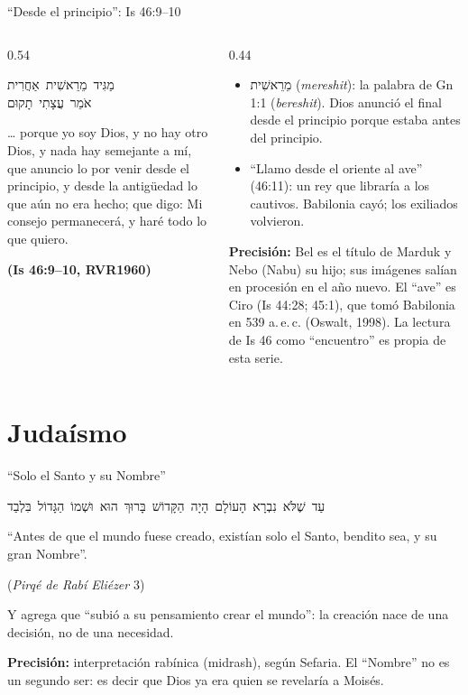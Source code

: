 \documentclass[hyperref={bookmarks=false},aspectratio=169]{beamer}
\newcommand{\heb}[1]{\mbox{\foreignlanguage{hebrew}{#1}}}
\newcommand{\fuente}[1]{\par\hfill{\upshape\bfseries\footnotesize\textcolor{azul}{#1}}}
\newcommand{\precision}[1]{{\footnotesize\color{gris}\textbf{Precisión:} #1}}
\begin{document}
\begin{frame}{``Desde el principio'': Is 46:9--10}
\begin{columns}[t,onlytextwidth]
\begin{column}{0.54\textwidth}
\begin{center}\heb{מַגִּיד מֵרֵאשִׁית אַחֲרִית}\\[1pt]\heb{אֹמֵר עֲצָתִי תָקוּם}\end{center}
\begin{cita}\ldots{} porque yo soy Dios, y no hay otro Dios, y nada hay semejante a mí, que anuncio lo por venir desde el principio, y desde la antigüedad lo que aún no era hecho; que digo: Mi consejo permanecerá, y haré todo lo que quiero.\fuente{(Is 46:9--10, RVR1960)}\end{cita}
\end{column}
\begin{column}{0.44\textwidth}\scriptsize
\begin{itemize}
\item \heb{מֵרֵאשִׁית} (\emph{mereshit}): la palabra de Gn 1:1 (\emph{bereshit}). Dios anunció el final desde el principio porque estaba antes del principio.
\item ``Llamo desde el oriente al ave'' (46:11): un rey que libraría a los cautivos. Babilonia cayó; los exiliados volvieron.
\end{itemize}
\precision{Bel es el título de Marduk y Nebo (Nabu) su hijo; sus imágenes salían en procesión en el año nuevo. El ``ave'' es Ciro (Is 44:28; 45:1), que tomó Babilonia en 539 a.\,e.\,c. (Oswalt, 1998). La lectura de Is 46 como ``encuentro'' es propia de esta serie.}
\end{column}
\end{columns}
\end{frame}

\section{Judaísmo}

\begin{frame}{``Solo el Santo y su Nombre''}
\begin{center}\heb{עַד שֶׁלֹּא נִבְרָא הָעוֹלָם הָיָה הַקָּדוֹשׁ בָּרוּךְ הוּא וּשְׁמוֹ הַגָּדוֹל בִּלְבַד}\end{center}
\begin{tcolorbox}[colback=papiro,colframe=dorado,boxrule=1pt,arc=3pt]
\centering\small ``Antes de que el mundo fuese creado, existían solo el Santo, bendito sea, y su gran Nombre''.\par{\scriptsize\color{gris}(\emph{Pirqé de Rabí Eliézer} 3)}
\end{tcolorbox}
\small Y agrega que ``subió a su pensamiento crear el mundo'': la creación nace de una decisión, no de una necesidad.\par\medskip
\precision{interpretación rabínica (midrash), según Sefaria. El ``Nombre'' no es un segundo ser: es decir que Dios ya era quien se revelaría a Moisés.}
\end{frame}
\end{document}
